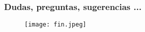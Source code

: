 
\begin{frame}
	
	\frametitle{Dudas, preguntas, sugerencias ...}
	
	\begin{figure}[h]
		\centering
		\texttt{[image: fin.jpeg]}
	\end{figure}
	
\end{frame}

